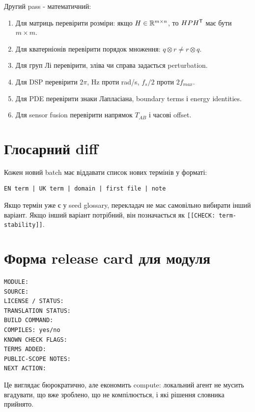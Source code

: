 Другий pass - математичний:
\begin{enumerate}[label=\arabic*.]
\item Для матриць перевірити розміри: якщо $H\in\mathbb{R}^{m\times n}$, то $HPH^{\mathsf{T}}$ має бути $m\times m$.
\item Для кватерніонів перевірити порядок множення: $q\otimes r\ne r\otimes q$.
\item Для груп Лі перевірити, зліва чи справа задається perturbation.
\item Для DSP перевірити $2\pi$, Hz проти rad/s, $f_s/2$ проти $2f_{max}$.
\item Для PDE перевірити знаки Лапласіана, boundary terms і energy identities.
\item Для sensor fusion перевірити напрямок $T_{AB}$ і часові offset.
\end{enumerate}

\section{Глосарний diff}

Кожен новий batch має віддавати список нових термінів у форматі:

\begin{lstlisting}
EN term | UK term | domain | first file | note
\end{lstlisting}

Якщо термін уже є у seed glossary, перекладач не має самовільно вибирати інший варіант. Якщо інший варіант потрібний, він позначається як \texttt{[[CHECK: term-stability]]}.

\section{Форма release card для модуля}

\begin{lstlisting}
MODULE:
SOURCE:
LICENSE / STATUS:
TRANSLATION STATUS:
BUILD COMMAND:
COMPILES: yes/no
KNOWN CHECK FLAGS:
TERMS ADDED:
PUBLIC-SCOPE NOTES:
NEXT ACTION:
\end{lstlisting}

Це виглядає бюрократично, але економить compute: локальний агент не мусить вгадувати, що вже зроблено, що не компілюється, і які рішення словника прийнято.
